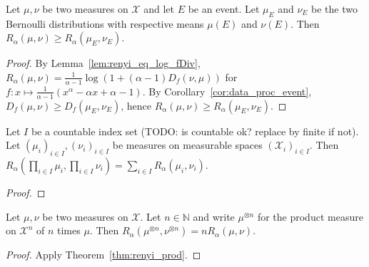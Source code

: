 \begin{lemma}
  \label{lem:renyi_data_proc_event}
  Let $\mu, \nu$ be two measures on $\mathcal X$ and let $E$ be an event. Let $\mu_E$ and $\nu_E$ be the two Bernoulli distributions with respective means $\mu(E)$ and $\nu(E)$.
  Then $R_\alpha(\mu, \nu) \ge R_\alpha(\mu_E, \nu_E)$.
\end{lemma}

\begin{proof}
By Lemma~\ref{lem:renyi_eq_log_fDiv}, $R_\alpha(\mu, \nu) = \frac{1}{\alpha - 1} \log (1 + (\alpha - 1) D_f(\nu, \mu))$ for $f : x \mapsto \frac{1}{\alpha - 1}(x^{\alpha} - \alpha x + \alpha - 1)$.
By Corollary~\ref{cor:data_proc_event}, $D_f(\mu, \nu) \ge D_f(\mu_E, \nu_E)$, hence $R_\alpha(\mu, \nu) \ge R_\alpha(\mu_E, \nu_E)$.
\end{proof}

\begin{theorem}[Tensorization]
  \label{thm:renyi_prod}
  Let $I$ be a countable index set (TODO: is countable ok? replace by finite if not). Let $(\mu_i)_{i \in I}, (\nu_i)_{i \in I}$ be measures on measurable spaces $(\mathcal X_i)_{i \in I}$.
  Then $R_\alpha (\prod_{i \in I} \mu_i, \prod_{i \in I} \nu_i) = \sum_{i \in I} R_\alpha(\mu_i, \nu_i)$.
\end{theorem}

\begin{proof}
\end{proof}

\begin{corollary}
  \label{lem:renyi_prod_n}
  Let $\mu, \nu$ be two measures on $\mathcal X$. Let $n \in \mathbb{N}$ and write $\mu^{\otimes n}$ for the product measure on $\mathcal X^n$ of $n$ times $\mu$.
  Then $R_\alpha(\mu^{\otimes n}, \nu^{\otimes n}) = n R_\alpha(\mu, \nu)$.
\end{corollary}

\begin{proof}
Apply Theorem~\ref{thm:renyi_prod}.
\end{proof}